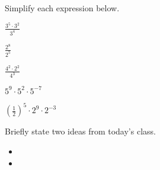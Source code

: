 \begin{problem}
  \vfill

  \clearpage

\item Simplify each expression below.
  \begin{subproblem}
  \item $\frac{3^5\cdot 3^2}{3^4}$
    \vfill
  \item $\frac{2^8}{2^5}$
    \vfill
  \item $\frac{4^2\cdot 2^2}{4^3}$
    \vfill
  \item $5^9\cdot 5^2\cdot 5^{-7}$
    \vfill
  \item $\left(\frac{1}{2}\right)^5 \cdot 2^9 \cdot 2^{-3}$
    \vfill
  \end{subproblem}

\end{problem}

\postClass

\begin{problem}
\item Briefly state two ideas from today's class.
  \begin{itemize}
  \item 
  \item 
  \end{itemize}
\item 
  \begin{subproblem}
    \item
  \end{subproblem}
\end{problem}



